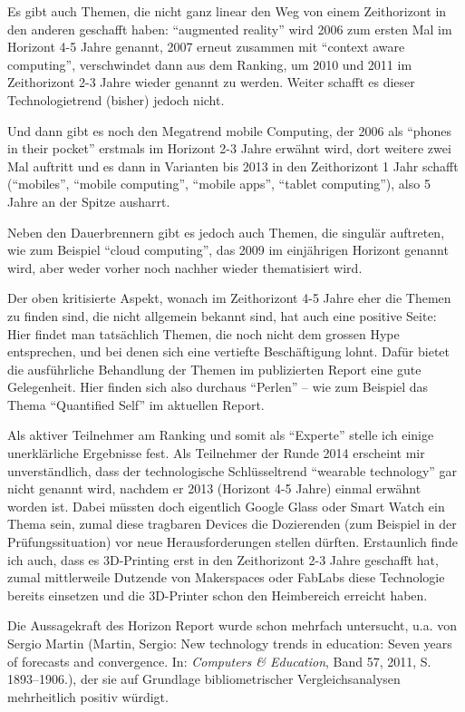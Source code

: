 \documentclass[a4paper,
fontsize=11pt,
oneside,
numbers=noperiodatend,
parskip=half-,
bibliography=totoc,
final
]{scrartcl}
\begin{document}
Es gibt auch Themen, die nicht ganz linear den Weg von einem
Zeithorizont in den anderen geschafft haben: \enquote{augmented reality}
wird 2006 zum ersten Mal im Horizont 4-5 Jahre genannt, 2007 erneut
zusammen mit \enquote{context aware computing}, verschwindet dann aus
dem Ranking, um 2010 und 2011 im Zeithorizont 2-3 Jahre wieder genannt
zu werden. Weiter schafft es dieser Technologietrend (bisher) jedoch
nicht.

Und dann gibt es noch den Megatrend mobile Computing, der 2006 als
\enquote{phones in their pocket} erstmals im Horizont 2-3 Jahre erwähnt
wird, dort weitere zwei Mal auftritt und es dann in Varianten bis 2013
in den Zeithorizont 1 Jahr schafft (\enquote{mobiles}, \enquote{mobile
computing}, \enquote{mobile apps}, \enquote{tablet computing}), also 5
Jahre an der Spitze ausharrt.

Neben den Dauerbrennern gibt es jedoch auch Themen, die singulär
auftreten, wie zum Beispiel \enquote{cloud computing}, das 2009 im
einjährigen Horizont genannt wird, aber weder vorher noch nachher wieder
thematisiert wird.

Der oben kritisierte Aspekt, wonach im Zeithorizont 4-5 Jahre eher die
Themen zu finden sind, die nicht allgemein bekannt sind, hat auch eine
positive Seite: Hier findet man tatsächlich Themen, die noch nicht dem
grossen Hype entsprechen, und bei denen sich eine vertiefte
Beschäfti\-gung lohnt. Dafür bietet die ausführliche Behandlung der Themen
im publizierten Report eine gute Gelegenheit. Hier finden sich also
durchaus \enquote{Perlen} -- wie zum Beispiel das Thema
\enquote{Quantified Self} im aktuellen Report.

Als aktiver Teilnehmer am Ranking und somit als \enquote{Experte} stelle
ich einige unerklärliche Ergebnisse fest. Als Teilnehmer der Runde 2014
erscheint mir unverständlich, dass der technologische Schlüsseltrend
\enquote{wearable technology} gar nicht genannt wird, nachdem er 2013
(Horizont 4-5 Jahre) einmal erwähnt worden ist. Dabei müssten doch
eigentlich Google Glass oder Smart Watch ein Thema sein, zumal diese
tragbaren Devices die Dozierenden (zum Beispiel in der
Prüfungssituation) vor neue Herausforderungen stellen dürften.
Erstaunlich finde ich auch, dass es 3D-Printing erst in den Zeithorizont
2-3 Jahre geschafft hat, zumal mittlerweile Dutzende von Makerspaces
oder FabLabs diese Technologie bereits einsetzen und die 3D-Printer
schon den Heimbereich erreicht haben.

Die Aussagekraft des Horizon Report wurde schon mehrfach untersucht,
u.a. von Sergio Martin (Martin, Sergio: New technology trends in
education: Seven years of forecasts and convergence. In: \emph{Computers
\& Education}, Band 57, 2011, S. 1893--1906.), der sie auf Grundlage
bibliometrischer Vergleichsanalysen mehrheitlich positiv würdigt.
\end{document}
